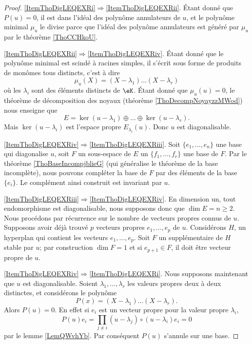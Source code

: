 \begin{proof}
    \ref{ItemThoDigLEQEXRi}\( \Rightarrow\)\ref{ItemThoDigLEQEXRii}. Étant donné que \( P(u)=0\), il est dans l'idéal des polynôme annulateurs de \( u\), et le polynôme minimal \( \mu_u\) le divise parce que l'idéal des polynôme annulateurs est généré par \( \mu_u\) par le théorème \ref{ThoCCHkoU}.

    \ref{ItemThoDigLEQEXRii}\( \Rightarrow\)\ref{ItemThoDigLEQEXRiv}. Étant donné que le polynôme minimal est scindé à racines simples, il s'écrit sous forme de produits de monômes tous distincts, c'est à dire
    \begin{equation}
        \mu_u(X)=(X-\lambda_1)\ldots(X-\lambda_r)
    \end{equation}
    où les \( \lambda_i\) sont des éléments distincts de \( \eK\). Étant donné que \( \mu_u(u)=0\), le théorème de décomposition des noyaux (théorème \ref{ThoDecompNoyayzzMWod}) nous enseigne que
    \begin{equation}
        E=\ker(u-\lambda_1)\oplus\ldots\oplus\ker(u-\lambda_r).
    \end{equation}
    Mais \( \ker(u-\lambda_i)\) est l'espace propre \( E_{\lambda_i}(u)\). Donc \( u\) est diagonalisable.

    \ref{ItemThoDigLEQEXRiv}\( \Rightarrow\)\ref{ItemThoDigLEQEXRiii}. Soit \( \{ e_1,\ldots, e_n \}\) une base qui diagonalise \( u\), soit \( F\) un sous-espace de \( E\) un \( \{ f_1,\ldots, f_r \}\) une base de \( F\). Par le théorème \ref{ThoBaseIncompjblieG} (qui généralise le théorème de la base incomplète), nous pouvons compléter la base de \( F\) par des éléments de la base \( \{ e_i \}\). Le complément ainsi construit est invariant par \( u\).

    \ref{ItemThoDigLEQEXRiii}\( \Rightarrow\)\ref{ItemThoDigLEQEXRiv}. En dimension un, tout endomorphisme est diagonalisable, nous supposons donc que \( \dim E=n\geq 2\). Nous procédons par récurrence sur le nombre de vecteurs propres connus de \( u\). Supposons avoir déjà trouvé \( p\) vecteurs propres \( e_1,\ldots, e_p\) de \( u\). Considérons \( H\), un hyperplan qui contient les vecteurs \( e_1,\ldots, e_p\). Soit \( F\) un supplémentaire de \( H\) stable par \( u\); par construction \( \dim F=1\) et si \( e_{p+1}\in F\), il doit être vecteur propre de \( u\).

    \ref{ItemThoDigLEQEXRiv}\( \Rightarrow\)\ref{ItemThoDigLEQEXRi}. Nous supposons maintenant que \( u\) est diagonalisable. Soient \( \lambda_1,\ldots, \lambda_r\) les valeurs propres deux à deux distinctes, et considérons le polynôme
    \begin{equation}
        P(x)=(X-\lambda_1)\ldots (X-\lambda_r).
    \end{equation}
    Alors \( P(u)=0\). En effet si \( e_i\) est un vecteur propre pour la valeur propre \( \lambda_i\), 
    \begin{equation}
        P(u)e_i=\prod_{j\neq i}(u-\lambda_j)\circ(u-\lambda_i)e_i=0
    \end{equation}
    par le lemme \ref{LemQWvhYb}. Par conséquent \( P(u)\) s'annule sur une base.
\end{proof}


